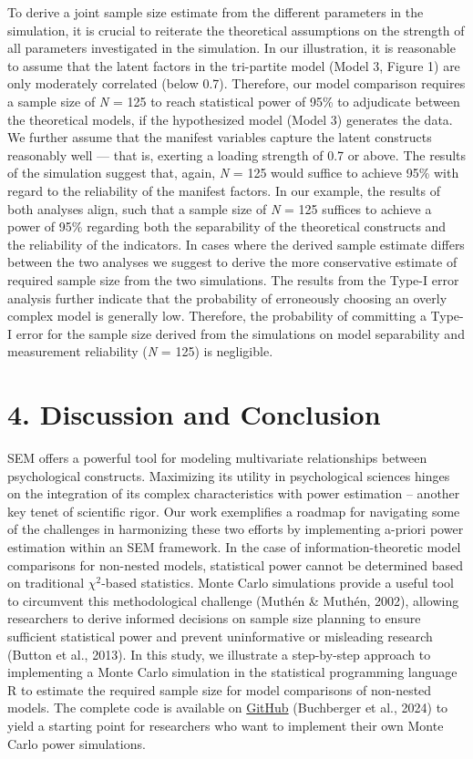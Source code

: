 \documentclass[
  man,floatsintext]{apa6}
\begin{document}
To derive a joint sample size estimate from the different parameters in the simulation, it is crucial to reiterate the theoretical assumptions on the strength of all parameters investigated in the simulation. In our illustration, it is reasonable to assume that the latent factors in the tri-partite model (Model 3, Figure 1) are only moderately correlated (below 0.7). Therefore, our model comparison requires a sample size of \emph{N} = 125 to reach statistical power of 95\% to adjudicate between the theoretical models, if the hypothesized model (Model 3) generates the data. We further assume that the manifest variables capture the latent constructs reasonably well --- that is, exerting a loading strength of 0.7 or above. The results of the simulation suggest that, again, \emph{N} = 125 would suffice to achieve 95\% with regard to the reliability of the manifest factors. In our example, the results of both analyses align, such that a sample size of \emph{N} = 125 suffices to achieve a power of 95\% regarding both the separability of the theoretical constructs and the reliability of the indicators. In cases where the derived sample estimate differs between the two analyses we suggest to derive the more conservative estimate of required sample size from the two simulations.
The results from the Type-I error analysis further indicate that the probability of erroneously choosing an overly complex model is generally low. Therefore, the probability of committing a Type-I error for the sample size derived from the simulations on model separability and measurement reliability (\emph{N} = 125) is negligible.

\hypertarget{discussion-and-conclusion}{%
\section{4. Discussion and Conclusion}\label{discussion-and-conclusion}}

SEM offers a powerful tool for modeling multivariate relationships between psychological constructs. Maximizing its utility in psychological sciences hinges on the integration of its complex characteristics with power estimation -- another key tenet of scientific rigor. Our work exemplifies a roadmap for navigating some of the challenges in harmonizing these two efforts by implementing a-priori power estimation within an SEM framework. In the case of information-theoretic model comparisons for non-nested models, statistical power cannot be determined based on traditional \(\chi^2\)-based statistics. Monte Carlo simulations provide a useful tool to circumvent this methodological challenge (Muthén \& Muthén, 2002), allowing researchers to derive informed decisions on sample size planning to ensure sufficient statistical power and prevent uninformative or misleading research (Button et al., 2013). In this study, we illustrate a step-by-step approach to implementing a Monte Carlo simulation in the statistical programming language R to estimate the required sample size for model comparisons of non-nested models. The complete code is available on \href{https://github.com/ebuchberger/Estimating-Power-for-SEM}{GitHub} (Buchberger et al., 2024) to yield a starting point for researchers who want to implement their own Monte Carlo power simulations.
\end{document}
